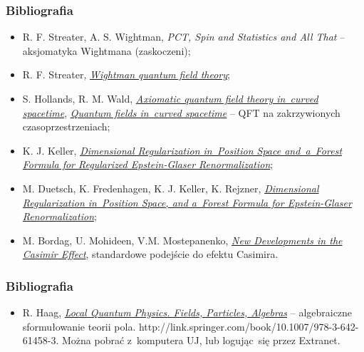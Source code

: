 \documentclass[10pt,t]{beamer}
\begin{document}
\begin{frame}
  \frametitle{Bibliografia}


  \begin{itemize}

  \item R. F. Streater, A. S. Wightman, \textit{PCT, Spin and
    Statistics and All That} -- aksjomatyka Wightmana (zaskoczeni);

  \item R. F. Streater,
    \href{http://www.scholarpedia.org/article/Wightman_quantum_field_theory}
    {\textit{Wightman quantum field theory}};

  \item S. Hollands, R. M. Wald,
    \href{http://arxiv.org/abs/0803.2003}{\textit{Axiomatic quantum field
        theory in~curved spacetime}},
    \href{http://arxiv.org/abs/1401.2026}{\textit{Quantum fields in~curved
        spacetime}} -- QFT na zakrzywionych czasoprzestrzeniach;

  \item K. J. Keller,
    \href{http://arxiv.org/abs/1006.2148}{\textit{Dimensional
        Regularization in~Position Space and~a~Forest Formula for
        Regularized Epstein-Glaser Renormalization}};

  \item M. Duetsch, K. Fredenhagen, K. J. Keller, K. Rejzner,
    \href{http://arxiv.org/abs/1311.5424}{\textit{Dimensional
        Regularization in~Position Space, and a~Forest Formula for
        Epstein-Glaser Renormalization}};

  \item M. Bordag, U. Mohideen, V.M. Mostepanenko,
    \href{http://arxiv.org/abs/quant-ph/0106045}{\textit{New Developments
      in the Casimir Effect}}, standardowe podejście do efektu
    Casimira.

  \end{itemize}

\end{frame}





\begin{frame}
  \frametitle{Bibliografia}


  \begin{itemize}

  \item R. Haag,
    \href{http://link.springer.com/book/10.1007/978-3-642-61458-3}
    {\textit{Local Quantum Physics. Fields, Particles, Algebras}} --
    algebraiczne sformułowanie teorii pola.
    http://link.springer.com/book/10.1007/978-3-642-61458-3. Można
    pobrać z~komputera UJ, lub logując~się przez Extranet.

  \end{itemize}

\end{frame}











\end{document}
